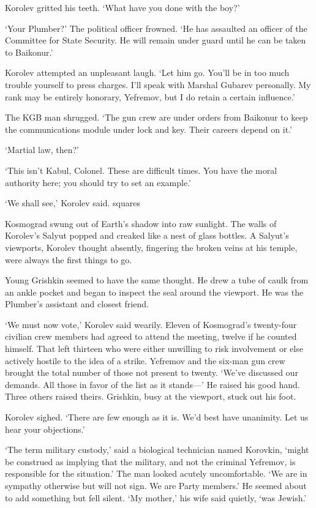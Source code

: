 Korolev gritted his teeth. ‘What have you done with the boy?’

‘Your Plumber?’ The political officer frowned. ‘He has assaulted an officer of the Committee for State Security. He will remain under guard until he can be taken to Baikonur.’

Korolev attempted an unpleasant laugh. ‘Let him go. You’ll be in too much trouble yourself to press charges. I’ll speak with Marshal Gubarev personally. My rank may be entirely honorary, Yefremov, but I do retain a certain influence.’

The KGB man shrugged. ‘The gun crew are under orders from Baikonur to keep the communications module under lock and key. Their careers depend on it.’

‘Martial law, then?’

‘This isn’t Kabul, Colonel. These are difficult times. You have the moral authority here; you should try to set an example.’

‘We shall see,’ Korolev said.
squares

Kosmograd swung out of Earth’s shadow into raw sunlight. The walls of Korolev’s Salyut popped and creaked like a nest of glass bottles. A Salyut’s viewports, Korolev thought absently, fingering the broken veins at his temple, were always the first things to go.

Young Grishkin seemed to have the same thought. He drew a tube of caulk from an ankle pocket and began to inspect the seal around the viewport. He was the Plumber’s assistant and closest friend.

‘We must now vote,’ Korolev said wearily. Eleven of Kosmograd’s twenty-four civilian crew members had agreed to attend the meeting, twelve if he counted himself. That left thirteen who were either unwilling to risk involvement or else actively hostile to the idea of a strike. Yefremov and the six-man gun crew brought the total number of those not present to twenty. ‘We’ve discussed our demands. All those in favor of the list as it stands—’ He raised his good hand. Three others raised theirs. Grishkin, busy at the viewport, stuck out his foot.

Korolev sighed. ‘There are few enough as it is. We’d best have unanimity. Let us hear your objections.’

‘The term military custody,’ said a biological technician named Korovkin, ‘might be construed as implying that the military, and not the criminal Yefremov, is responsible for the situation.’ The man looked acutely uncomfortable. ‘We are in sympathy otherwise but will not sign. We are Party members.’ He seemed about to add something but fell silent. ‘My mother,’ his wife said quietly, ‘was Jewish.’


